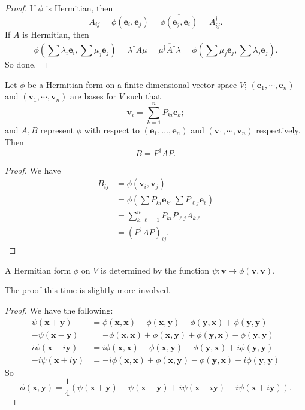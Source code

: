 \documentclass[a4paper]{article}
\begin{document}
\begin{proof}
  If $\phi$ is Hermitian, then
  \[
    A_{ij} = \phi(\mathbf{e}_i, \mathbf{e}_j) = \overline{\phi(\mathbf{e}_j, \mathbf{e}_i)} = A^{\dagger}_{ij}.
  \]
  If $A$ is Hermitian, then
  \[
    \phi\left(\sum \lambda_i \mathbf{e}_i, \sum \mu_j \mathbf{e}_j\right) = \lambda^\dagger A \mu = \overline{\mu^\dagger A^\dagger \lambda} = \overline{\phi\left(\sum \mu_j \mathbf{e}_j, \sum \lambda_j \mathbf{e}_j\right)}.
  \]
  So done.
\end{proof}

\begin{prop}
  Let $\phi$ be a Hermitian form on a finite dimensional vector space $V$; $(\mathbf{e}_1, \cdots, \mathbf{e}_n)$ and $(\mathbf{v}_1, \cdots, \mathbf{v}_n)$ are bases for $V$ such that
  \[
    \mathbf{v}_i = \sum_{k = 1}^n P_{ki} \mathbf{e}_k;
  \]
  and $A, B$ represent $\phi$ with respect to $(\mathbf{e}_1, \ldots, \mathbf{e}_n)$ and $(\mathbf{v}_1, \cdots, \mathbf{v}_n)$ respectively. Then
  \[
    B = P^\dagger AP.
  \]
\end{prop}

\begin{proof}
  We have
  \begin{align*}
    B_{ij} &= \phi(\mathbf{v}_i, \mathbf{v}_j) \\
    &= \phi\left(\sum P_{ki} \mathbf{e}_k, \sum P_{\ell j} \mathbf{e}_\ell\right)\\
    &= \sum_{k, \ell = 1}^n \bar{P}_{ki} P_{\ell j} A_{k\ell}\\
    &= (P^\dagger AP)_{ij}.
  \end{align*}
\end{proof}

\begin{lemma}
  A Hermitian form $\phi$ on $V$ is determined by the function $\psi: \mathbf{v} \mapsto \phi(\mathbf{v}, \mathbf{v})$.
\end{lemma}

The proof this time is slightly more involved.
\begin{proof}
  We have the following:
  \begin{align*}
    \psi(\mathbf{x} + \mathbf{y}) &= \phi(\mathbf{x}, \mathbf{x}) + \phi(\mathbf{x}, \mathbf{y}) + \phi(\mathbf{y}, \mathbf{x}) + \phi(\mathbf{y}, \mathbf{y})\\
   -\psi(\mathbf{x} - \mathbf{y}) &= -\phi(\mathbf{x}, \mathbf{x}) + \phi(\mathbf{x}, \mathbf{y}) + \phi(\mathbf{y}, \mathbf{x}) - \phi(\mathbf{y}, \mathbf{y})\\
   i\psi(\mathbf{x} -i\mathbf{y}) &= i\phi(\mathbf{x}, \mathbf{x}) + \phi(\mathbf{x}, \mathbf{y}) - \phi(\mathbf{y}, \mathbf{x}) +i\phi(\mathbf{y}, \mathbf{y})\\
  -i\psi(\mathbf{x} +i\mathbf{y}) &=-i\phi(\mathbf{x}, \mathbf{x}) + \phi(\mathbf{x}, \mathbf{y}) - \phi(\mathbf{y}, \mathbf{x}) -i\phi(\mathbf{y}, \mathbf{y})
  \end{align*}
  So
  \[
    \phi(\mathbf{x}, \mathbf{y}) = \frac{1}{4}(\psi(\mathbf{x} + \mathbf{y}) - \psi(\mathbf{x} - \mathbf{y}) + i\psi(\mathbf{x} - i\mathbf{y}) - i \psi(\mathbf{x} + i\mathbf{y})).
  \]
\end{proof}
\end{document}

